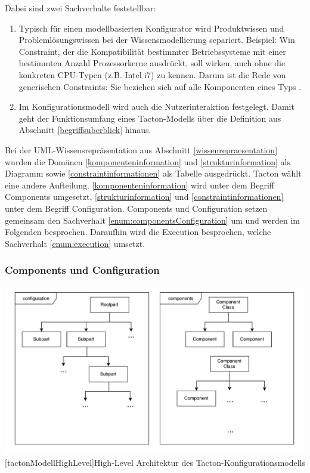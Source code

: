 \documentclass[11pt, a4paper, titlepage, listof=totoc, bibliography=totoc, index=totoc, twoside, openright, headings=normal]{scrreprt}
\begin{document}
Dabei sind zwei Sachverhalte feststellbar:
\begin{enumerate}[(1)]
\item \label{enum:componentsConfiguration} Typisch für einen modellbasierten Konfigurator wird Produktwissen und Problemlösungswissen bei der Wissensmodellierung separiert. Beispiel: Win Constraint, der die Kompatibilität bestimmter Betriebssysteme mit einer bestimmten Anzahl Prozessorkerne ausdrückt, soll wirken, auch ohne die konkreten CPU-Typen (z.B. Intel i7) zu kennen. Darum ist die Rede von generischen Constraints: Sie beziehen sich auf alle Komponenten eines Typs \citep{felferning14}.
\item \label{enum:execution} Im Konfigurationsmodell wird auch die Nutzerinteraktion festgelegt. Damit geht der Funktionsumfang eines Tacton-Modells über die Definition aus Abschnitt \ref{begriffsuberblick} hinaus.
\end{enumerate}

Bei der UML-Wissensrepräsentation aus Abschnitt \ref{wissenrepraesentation} wurden die Domänen \eqref{komponenteninformation} und \eqref{strukturinformation} als Diagramm sowie \eqref{constraintinformationen} als Tabelle ausgedrückt. Tacton wählt eine andere Aufteilung. \eqref{komponenteninformation} wird unter dem Begriff \glqq Components\grqq{} umgesetzt, \eqref{strukturinformation} und \eqref{constraintinformationen} unter dem Begriff \glqq Configuration\grqq{}. Components und Configuration setzen gemeinsam den Sachverhalt \eqref{enum:componentsConfiguration} um und werden im Folgenden besprochen. Daraufhin wird die \glqq Execution\grqq{} besprochen, welche Sachverhalt \eqref{enum:execution} umsetzt.


\subsubsection{Components und Configuration}

\vspace{1em}
\begin{minipage}{\linewidth}
	\centering
	\includegraphics[width=1\linewidth]{Abbildungen/tactonModellHighLevel.pdf}
	[tactonModellHighLevel]{High-Level Architektur des Tacton-Konfigurationsmodells}
	\label{fig:tactonModellHighLevel}
\end{minipage}
\vspace{1em}
\end{document}

